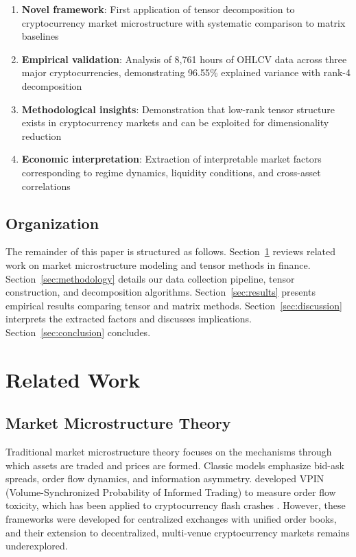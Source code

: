 \documentclass[11pt,twocolumn]{article}
\begin{document}
\begin{enumerate}[leftmargin=*]
    \item \textbf{Novel framework}: First application of tensor decomposition to cryptocurrency market microstructure with systematic comparison to matrix baselines
    \item \textbf{Empirical validation}: Analysis of 8,761 hours of OHLCV data across three major cryptocurrencies, demonstrating 96.55\% explained variance with rank-4 decomposition
    \item \textbf{Methodological insights}: Demonstration that low-rank tensor structure exists in cryptocurrency markets and can be exploited for dimensionality reduction
    \item \textbf{Economic interpretation}: Extraction of interpretable market factors corresponding to regime dynamics, liquidity conditions, and cross-asset correlations
\end{enumerate}

\subsection{Organization}

The remainder of this paper is structured as follows. Section~\ref{sec:related} reviews related work on market microstructure modeling and tensor methods in finance. Section~\ref{sec:methodology} details our data collection pipeline, tensor construction, and decomposition algorithms. Section~\ref{sec:results} presents empirical results comparing tensor and matrix methods. Section~\ref{sec:discussion} interprets the extracted factors and discusses implications. Section~\ref{sec:conclusion} concludes.

\section{Related Work}
\label{sec:related}

\subsection{Market Microstructure Theory}

Traditional market microstructure theory \citep{OHara1995Market,Hasbrouck2007Empirical} focuses on the mechanisms through which assets are traded and prices are formed. Classic models emphasize bid-ask spreads, order flow dynamics, and information asymmetry. \citet{Easley2012Flow} developed VPIN (Volume-Synchronized Probability of Informed Trading) to measure order flow toxicity, which has been applied to cryptocurrency flash crashes \citep{Easley2024CrossAsset}. However, these frameworks were developed for centralized exchanges with unified order books, and their extension to decentralized, multi-venue cryptocurrency markets remains underexplored.
\end{document}
